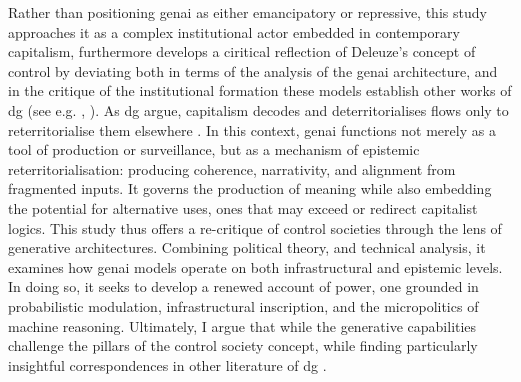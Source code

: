 Rather than positioning \gls{genai} as either emancipatory or repressive, this study approaches it as a complex institutional actor embedded in contemporary capitalism, furthermore develops a ciritical reflection of Deleuze's concept of control by deviating both in terms of the analysis of the \gls{genai} architecture, and in the critique of the institutional formation these models establish other works of \gls{dg}  (see e.g. \cite{deleuze1983}, \cite{deleuze1987}). As \gls{dg} argue, capitalism decodes and deterritorialises flows only to reterritorialise them elsewhere \parencite{deleuze1983}. In this context, \gls{genai} functions not merely as a tool of production or surveillance, but as a mechanism of epistemic reterritorialisation: producing coherence, narrativity, and alignment from fragmented inputs. It governs the production of meaning while also embedding the potential for alternative uses, ones that may exceed or redirect capitalist logics. This study thus offers a re-critique of control societies through the lens of generative architectures. Combining political theory, and technical analysis, it examines how \gls{genai} models operate on both infrastructural and epistemic levels. In doing so, it seeks to develop a renewed account of power, one grounded in probabilistic modulation, infrastructural inscription, and the micropolitics of machine reasoning. Ultimately, I argue that while the generative capabilities challenge the pillars of the control society concept, while finding particularly insightful correspondences in other literature of \gls{dg} .

